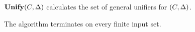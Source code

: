 \begin{theorem}[Completeness]\label{theo:unifyCompleteness}
  $\textbf{Unify}{} (C, \Delta)$ calculates {the set} of general
  unifiers for $(C, \Delta)$. 
\end{theorem}


\begin{theorem}[Termination]\label{theo:unifyTermination}
  The \unify{} algorithm terminates on every finite input set.
\end{theorem}


